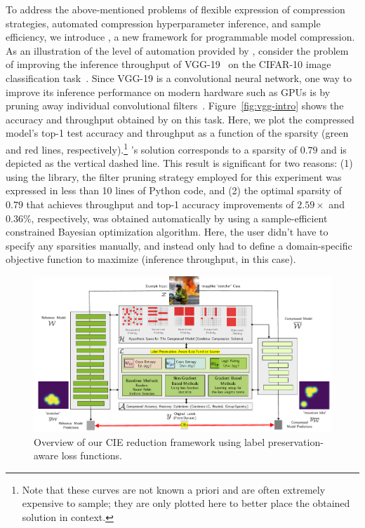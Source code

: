 \begin{refsection}
To address the above-mentioned problems of flexible expression of compression strategies, automated compression hyperparameter inference, and sample efficiency, we introduce \algoName, a new framework for programmable model compression. As an illustration of the level of automation provided by \algoName,
consider the problem of improving the
inference throughput of VGG-19~\cite{simonyan2014very} on the CIFAR-10 image
classification task~\cite{krizhevsky2014cifar}.
%
Since VGG-19 is a convolutional neural network, one way to improve its
inference performance on modern hardware such as GPUs is by pruning
away individual convolutional filters~\cite{he2018progressive}.
%
Figure~\ref{fig:vgg-intro} shows the accuracy and throughput obtained
by \algoName on this task.
%
Here, we plot the compressed model's top-1 test accuracy and throughput as a function of the sparsity (green and red lines,
respectively).\footnote{Note that these curves are not known a priori and
are often extremely expensive to sample;
they are only plotted here to better place the obtained solution in context.}
%
\algoName's solution corresponds to a sparsity of $0.79$
and is depicted as the vertical dashed line.
%
This result is significant for two reasons: (1) using the \algoName library,
the filter pruning strategy employed for this experiment was expressed in
less than 10 lines of Python code, and (2) the optimal sparsity of
$0.79$ that
achieves throughput and top-1 accuracy improvements of $2.59\times$ and $0.36\%$, respectively,
was obtained automatically by \algoName using a sample-efficient constrained
Bayesian optimization algorithm.
%
Here, the user didn't have to specify any
sparsities manually, and instead only had to define a domain-specific
objective function to maximize (inference throughput, in this case).





\begin{figure}[!t]
\centering
  \includegraphics[width=\textwidth]{img/FinalIntroFigure.pdf}
  \caption{Overview of our CIE reduction framework using label preservation-aware loss functions.}
  \label{fig:overview}
\end{figure}

\end{refsection}